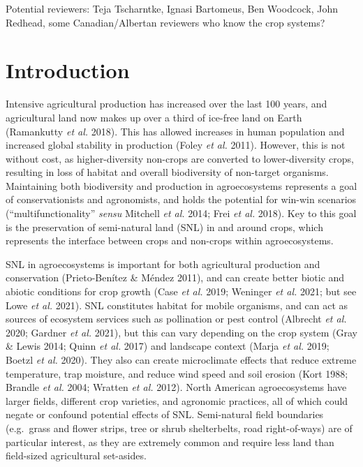 \documentclass[]{elsarticle} %
\begin{document}
Potential reviewers: Teja Tscharntke, Ignasi Bartomeus, Ben Woodcock, John Redhead, some Canadian/Albertan reviewers who know the crop systems?

\newpage
\doublespacing

\hypertarget{introduction}{%
\section{Introduction}\label{introduction}}

Intensive agricultural production has increased over the last 100 years, and agricultural land now makes up over a third of ice-free land on Earth (Ramankutty \emph{et al.} 2018).
This has allowed increases in human population and increased global stability in production (Foley \emph{et al.} 2011).
However, this is not without cost, as higher-diversity non-crops are converted to lower-diversity crops, resulting in loss of habitat and overall biodiversity of non-target organisms.
Maintaining both biodiversity and production in agroecosystems represents a goal of conservationists and agronomists, and holds the potential for win-win scenarios ({``multifunctionality''} \emph{sensu} Mitchell \emph{et al.} 2014; Frei \emph{et al.} 2018).
Key to this goal is the preservation of semi-natural land (SNL) in and around crops, which represents the interface between crops and non-crops within agroecosystems.

SNL in agroecosystems is important for both agricultural production and conservation (Prieto-Benítez \& Méndez 2011), and can create better biotic and abiotic conditions for crop growth (Case \emph{et al.} 2019; Weninger \emph{et al.} 2021; but see Lowe \emph{et al.} 2021).
SNL constitutes habitat for mobile organisms, and can act as sources of ecosystem services such as pollination or pest control (Albrecht \emph{et al.} 2020; Gardner \emph{et al.} 2021), but this can vary depending on the crop system (Gray \& Lewis 2014; Quinn \emph{et al.} 2017) and landscape context (Marja \emph{et al.} 2019; Boetzl \emph{et al.} 2020).
They also can create microclimate effects that reduce extreme temperature, trap moisture, and reduce wind speed and soil erosion (Kort 1988; Brandle \emph{et al.} 2004; Wratten \emph{et al.} 2012).
North American agroecosystems have larger fields, different crop varieties, and agronomic practices, all of which could negate or confound potential effects of SNL.
Semi-natural field boundaries (e.g.~grass and flower strips, tree or shrub shelterbelts, road right-of-ways) are of particular interest, as they are extremely common and require less land than field-sized agricultural set-asides.
\end{document}
